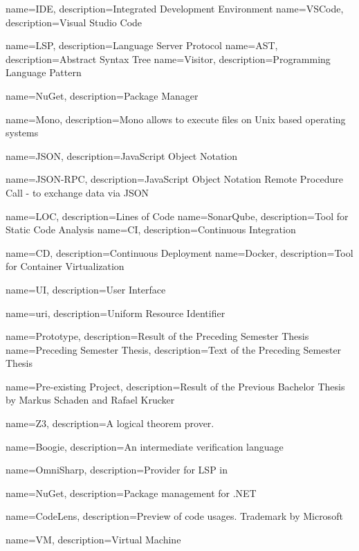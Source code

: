 {
	name=IDE,
	description={Integrated Development Environment}
}
{
	name=VSCode,
	description={Visual Studio Code}
}

{
	name=LSP,
	description={Language Server Protocol}
}
{
	name=AST,
	description={Abstract Syntax Tree}
}
{
	name=Visitor,
	description={Programming Language Pattern}
}

{
	name=NuGet,
	description={Package Manager}
}

{
	name=Mono,
	description={Mono allows to execute  files on Unix based operating systems}
}

{
	name=JSON,
	description={JavaScript Object Notation}
}

{
	name=JSON-RPC,
	description={JavaScript Object Notation Remote Procedure Call - to exchange data via JSON}
}

{
	name=LOC,
	description={Lines of Code}
}
{
	name=SonarQube,
	description={Tool for Static Code Analysis}
}
{
	name=CI,
	description={Continuous Integration}
}

{
	name=CD,
	description={Continuous Deployment}
}
{
	name=Docker,
	description={Tool for Container Virtualization}
}

{
	name=UI,
	description={User Interface}
}

{
	name=uri,
	description={Uniform Resource Identifier}
}

{
	name=Prototype,
	description={Result of the Preceding Semester Thesis}
}
{
	name=Preceding Semester Thesis,
	description={Text of the Preceding Semester Thesis}
}

{
	name=Pre-existing Project,
	description={Result of the Previous Bachelor Thesis by Markus Schaden and Rafael Krucker}
}

{
	name=Z3,
	description={A logical theorem prover.}
}

{
	name=Boogie,
	description={An intermediate verification language}
}

{
	name=OmniSharp,
	description={Provider for LSP in \Csharp}
}


{
	name=NuGet,
	description={Package management for .NET}
}

{
	name=CodeLens,
	description={Preview of code usages. Trademark by Microsoft}
}

{
	name=VM,
	description={Virtual Machine}
}
